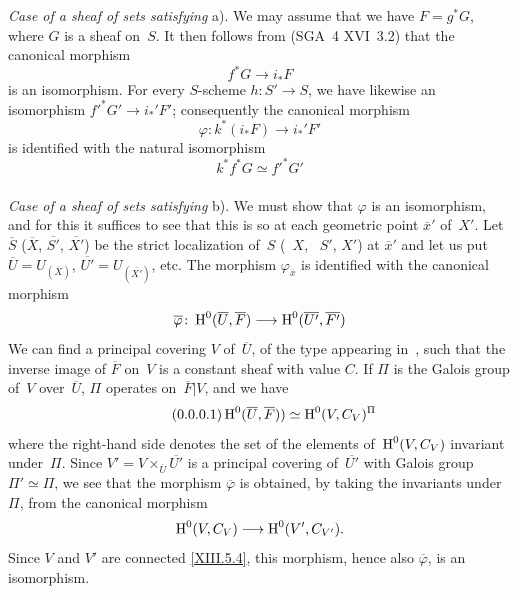 \subsubsection{}
\label{XIII.2.4.1}
\emph{Case of a sheaf of sets satisfying} a). We may
assume that we have $F=g^*G$, where $G$ is a sheaf on~$S$. It
then follows from (SGA~4 XVI~3.2) that the canonical morphism
\begin{equation*}
\label{eq:XIII.2.4.1.1}
\tag{\thesubsubsection.1} f^*G\to i_*F
\end{equation*}
is an isomorphism. For every $S$-scheme $h\colon S'\to S$, we have
likewise an isomorphism $f'^*G'\to i_*'F'$; consequently the canonical
morphism
$$
\varphi\colon k^*(i_*F)\to i_*'F'
$$
is identified with the natural isomorphism
$$
k^*f^*G\simeq f'^*G'
$$

\subsubsection{}
\label{XIII.2.4.2}
\emph{Case of a sheaf of sets satisfying} b). We must
show that $\varphi$ is an isomorphism, and for this it suffices to
see that this is so at each geometric point
$\overline{x}'$ of~$X'$. Let $\overline{S}$ (\resp $\overline{X}$,
\resp $\overline{S'}$, \resp $\overline{X'}$) be the strict localization
of~$S$ (\resp~$X$, \resp~$S'$, \resp $X'$) at $\overline{x}'$ and let us put
$\overline{U}=U_{(\overline{X})}$,
$\overline{U'}=U_{(\overline{X'})}$, etc. The morphism
$\varphi_{\overline{x}}$ is identified with the canonical morphism
$$
\overline{\varphi}\colon \H^0(\overline{U},\overline{F})\to
\H^0(\overline{U'}, \overline{F'})
$$
We can find a principal covering $V$ of~$\overline{U}$, of the
type appearing in~, such that the inverse image of
$\overline{F}$ on~$V$ is a constant sheaf with value $C$. If
$\Pi$ is the Galois group of~$V$ over~$\overline{U}$, $\Pi$
operates on~$\overline{F}|V$, and we have
\begin{equation*}
\label{eq:XIII.2.4.2.1}
\tag{\thesubsubsection.1}
\H^0(\overline{U},\overline{F}))\simeq \H^0(V,C_V)^{\Pi}
\end{equation*}
where the right-hand side denotes the set of the
elements of~$\operatorname{H}^0(V,C_V)$ invariant
under~$\Pi$. Since $V'=V\times_{\overline{U}}\overline{U'}$ is a
principal covering of~$\overline{U'}$ with Galois group
$\Pi'\simeq \Pi$, we see that the morphism $\overline{\varphi}$
is obtained, by taking the invariants under $\Pi$, from the
canonical morphism
$$
\H^0(V,C_V)\to \H^0(V',C_{V'}).
$$
Since $V$ and $V'$ are connected \eqref{XIII.5.4}, this morphism, hence
also $\overline{\varphi}$, is an isomorphism.

